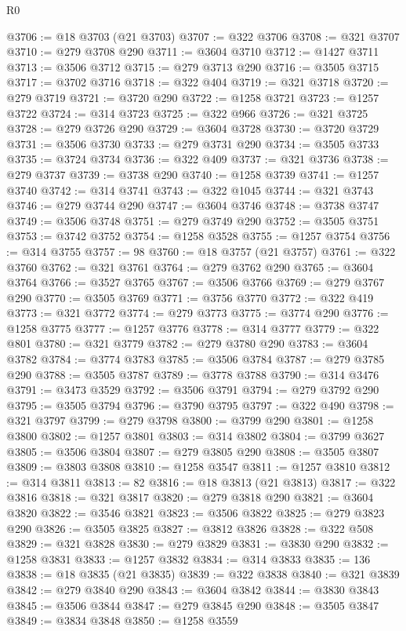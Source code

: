 \begin{lexlean}{R0}
\begin{coremodule}
@3706 := @18 @3703 (@21 @3703)
@3707 := @322 @3706
@3708 := @321 @3707
@3710 := @279 @3708 @290
@3711 := @3604 @3710
@3712 := @1427 @3711
@3713 := @3506 @3712
@3715 := @279 @3713 @290
@3716 := @3505 @3715
@3717 := @3702 @3716
@3718 := @322 @404
@3719 := @321 @3718
@3720 := @279 @3719
@3721 := @3720 @290
@3722 := @1258 @3721
@3723 := @1257 @3722
@3724 := @314 @3723
@3725 := @322 @966
@3726 := @321 @3725
@3728 := @279 @3726 @290
@3729 := @3604 @3728
@3730 := @3720 @3729
@3731 := @3506 @3730
@3733 := @279 @3731 @290
@3734 := @3505 @3733
@3735 := @3724 @3734
@3736 := @322 @409
@3737 := @321 @3736
@3738 := @279 @3737
@3739 := @3738 @290
@3740 := @1258 @3739
@3741 := @1257 @3740
@3742 := @314 @3741
@3743 := @322 @1045
@3744 := @321 @3743
@3746 := @279 @3744 @290
@3747 := @3604 @3746
@3748 := @3738 @3747
@3749 := @3506 @3748
@3751 := @279 @3749 @290
@3752 := @3505 @3751
@3753 := @3742 @3752
@3754 := @1258 @3528
@3755 := @1257 @3754
@3756 := @314 @3755
@3757 := 98
@3760 := @18 @3757 (@21 @3757)
@3761 := @322 @3760
@3762 := @321 @3761
@3764 := @279 @3762 @290
@3765 := @3604 @3764
@3766 := @3527 @3765
@3767 := @3506 @3766
@3769 := @279 @3767 @290
@3770 := @3505 @3769
@3771 := @3756 @3770
@3772 := @322 @419
@3773 := @321 @3772
@3774 := @279 @3773
@3775 := @3774 @290
@3776 := @1258 @3775
@3777 := @1257 @3776
@3778 := @314 @3777
@3779 := @322 @801
@3780 := @321 @3779
@3782 := @279 @3780 @290
@3783 := @3604 @3782
@3784 := @3774 @3783
@3785 := @3506 @3784
@3787 := @279 @3785 @290
@3788 := @3505 @3787
@3789 := @3778 @3788
@3790 := @314 @3476
@3791 := @3473 @3529
@3792 := @3506 @3791
@3794 := @279 @3792 @290
@3795 := @3505 @3794
@3796 := @3790 @3795
@3797 := @322 @490
@3798 := @321 @3797
@3799 := @279 @3798
@3800 := @3799 @290
@3801 := @1258 @3800
@3802 := @1257 @3801
@3803 := @314 @3802
@3804 := @3799 @3627
@3805 := @3506 @3804
@3807 := @279 @3805 @290
@3808 := @3505 @3807
@3809 := @3803 @3808
@3810 := @1258 @3547
@3811 := @1257 @3810
@3812 := @314 @3811
@3813 := 82
@3816 := @18 @3813 (@21 @3813)
@3817 := @322 @3816
@3818 := @321 @3817
@3820 := @279 @3818 @290
@3821 := @3604 @3820
@3822 := @3546 @3821
@3823 := @3506 @3822
@3825 := @279 @3823 @290
@3826 := @3505 @3825
@3827 := @3812 @3826
@3828 := @322 @508
@3829 := @321 @3828
@3830 := @279 @3829
@3831 := @3830 @290
@3832 := @1258 @3831
@3833 := @1257 @3832
@3834 := @314 @3833
@3835 := 136
@3838 := @18 @3835 (@21 @3835)
@3839 := @322 @3838
@3840 := @321 @3839
@3842 := @279 @3840 @290
@3843 := @3604 @3842
@3844 := @3830 @3843
@3845 := @3506 @3844
@3847 := @279 @3845 @290
@3848 := @3505 @3847
@3849 := @3834 @3848
@3850 := @1258 @3559

\end{coremodule}
\end{lexlean}
